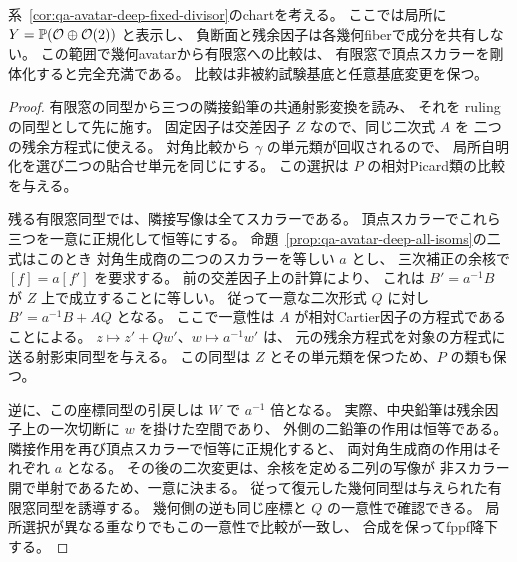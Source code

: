 \begin{corollary}[一重負断面chartの相対全Isom比較]
\label{cor:qa-avatar-deep-nonscalar-full-isom}
系~\ref{cor:qa-avatar-deep-fixed-divisor}のchartを考える。
ここでは局所に $Y=\mathbb P(\mathcal O\oplus\mathcal O(2))$ と表示し、
負断面と残余因子は各幾何fiberで成分を共有しない。
この範囲で幾何avatarから有限窓への比較は、
有限窓で頂点スカラーを剛体化すると完全充満である。
比較は非被約試験基底と任意基底変更を保つ。
\end{corollary}
\begin{proof}
有限窓の同型から三つの隣接鉛筆の共通射影変換を読み、
それを ruling の同型として先に施す。
固定因子は交差因子 $Z$ なので、同じ二次式 $A$ を
二つの残余方程式に使える。
対角比較から $\gamma$ の単元類が回収されるので、
局所自明化を選び二つの貼合せ単元を同じにする。
この選択は $P$ の相対Picard類の比較を与える。

残る有限窓同型では、隣接写像は全てスカラーである。
頂点スカラーでこれら三つを一意に正規化して恒等にする。
命題~\ref{prop:qa-avatar-deep-all-isoms}の二式はこのとき
対角生成商の二つのスカラーを等しい $a$ とし、
三次補正の余核で $[f]=a[f']$ を要求する。
前の交差因子上の計算により、
これは $B'=a^{-1}B$ が $Z$ 上で成立することに等しい。
従って一意な二次形式 $Q$ に対し
$B'=a^{-1}B+AQ$ となる。
ここで一意性は $A$ が相対Cartier因子の方程式であることによる。
$z\mapsto z'+Qw'$、$w\mapsto a^{-1}w'$ は、
元の残余方程式を対象の方程式に送る射影束同型を与える。
この同型は $Z$ とその単元類を保つため、$P$ の類も保つ。

逆に、この座標同型の引戻しは $W$ で $a^{-1}$ 倍となる。
実際、中央鉛筆は残余因子上の一次切断に $w$ を掛けた空間であり、
外側の二鉛筆の作用は恒等である。
隣接作用を再び頂点スカラーで恒等に正規化すると、
両対角生成商の作用はそれぞれ $a$ となる。
その後の二次変更は、余核を定める二列の写像が
非スカラー開で単射であるため、一意に決まる。
従って復元した幾何同型は与えられた有限窓同型を誘導する。
幾何側の逆も同じ座標と $Q$ の一意性で確認できる。
局所選択が異なる重なりでもこの一意性で比較が一致し、
合成を保ってfppf降下する。
\end{proof}

